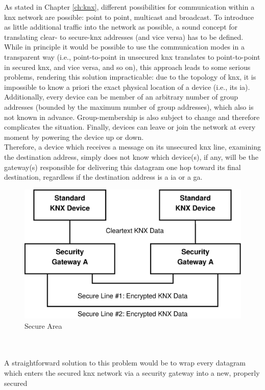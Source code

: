 As stated in Chapter \ref{ch:knx}, different possibilities for communication within a \gls{knx} network are possible: point to point, multicast and broadcast.
To introduce as little additional traffic into the network as possible, a sound concept for translating clear- to secure-\gls{knx} addresses (and vice versa) has to
be defined. While in principle it would be possible to use the communication modes in a transparent way (i.e., point-to-point in unsecured \gls{knx} translates
to point-to-point in secured \gls{knx}, and vice versa, and so on), this approach leads to some serious problems, rendering this solution impracticable:
due to the topology of \gls{knx}, it is impossible to know a priori the exact physical location of a device (i.e., its \gls{ia}). Additionally,
every device can be member of an arbitrary number of group addresses (bounded by the maximum number of group addresses), which also is not known in advance.
Group-membership is also subject to change and therefore complicates the situation. Finally, devices can leave or join the network at every moment by powering the
device up or down.
\\
Therefore, a device which receives a message on its unsecured \gls{knx} line, examining the destination address, simply does
not know which device(s), if any, will be the gateway(s) responsible for delivering this datagram one hop toward its final destination,
regardless if the destination address is a \gls{ia} or a \gls{ga}.
\begin{figure}
    \centering
    \includegraphics[width=1\textwidth]{figures/SecureArea.eps}
    \caption{Secure Area}
    \label{fig:secArea}
\end{figure}
\\
\\
A straightforward solution to this problem would be to wrap every datagram which enters the secured \gls{knx} network via a security gateway into a new, properly secured
